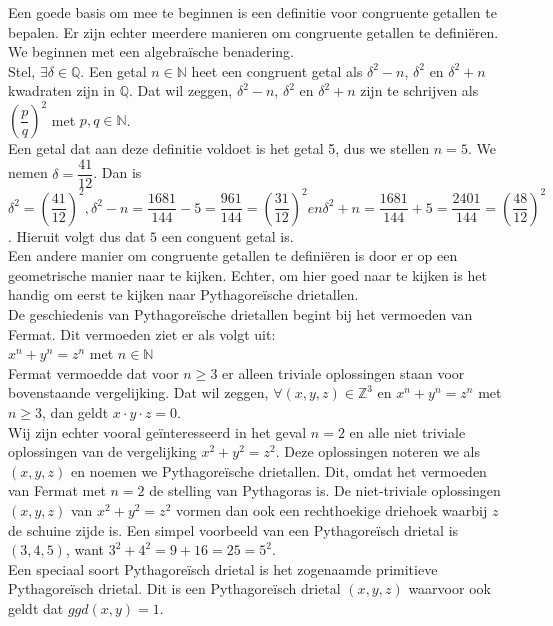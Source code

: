 \documentclass[12pt,reqno]{article}
\newcommand*{\NN}{\ensuremath{\mathbb{N}}}
\newcommand*{\ZZ}{\ensuremath{\mathbb{Z}}}
\newcommand*{\QQ}{\ensuremath{\mathbb{Q}}}
\begin{document}
	Een goede basis om mee te beginnen is een definitie voor congruente getallen te bepalen. Er zijn echter meerdere manieren om congruente getallen te defini\"{e}ren. We beginnen met een algebra\"{i}sche benadering. \\
	Stel, $\exists \delta \in \QQ$. Een getal $n \in \NN$ heet een congruent getal als $\delta^2 - n$, $\delta^2$ en $\delta^2 + n$ kwadraten zijn in \QQ. Dat wil zeggen, $\delta^2 - n$, $\delta^2$ en $\delta^2 + n$ zijn te schrijven als $\left(\dfrac{p}{q}\right)^2$ met $p, q \in \NN$. \\
	Een getal dat aan deze definitie voldoet is het getal 5, dus we stellen $n = 5$. We nemen $\delta = \dfrac{41}{12}$. Dan is $\delta^2 = \left( \dfrac{41}{12} \right)^2, \delta^2 - n = \dfrac{1681}{144} - 5 = \dfrac{961}{144} = \left( \dfrac{31}{12}\right)^2	en  \delta^2 + n = \dfrac{1681}{144} + 5 = \dfrac{2401}{144} = \left( \dfrac{48}{12}\right)^2$. Hieruit volgt dus dat $5$ een conguent getal is. \\
	Een andere manier om congruente getallen te defini\"{e}ren is door er op een geometrische manier naar te kijken. Echter, om hier goed naar te kijken is het handig om eerst te kijken naar Pythagore\"{i}sche drietallen. \\
	De geschiedenis van Pythagore\"{i}sche drietallen begint bij het vermoeden van Fermat. Dit vermoeden ziet er als volgt uit: \\
	$ x^n + y^n = z^n$ met $n \in \NN$\\
	Fermat vermoedde dat voor $n \geq 3$ er alleen triviale oplossingen staan voor bovenstaande vergelijking. Dat wil zeggen, $ \forall (x, y, z) \in \ZZ^3 $ en $ x^n + y^n = z^n $ met $ n \geq 3 $, dan geldt $ x \cdot y \cdot z = 0 $. \\
	Wij zijn echter vooral ge\"{i}nteresseerd in het geval $ n = 2 $ en alle niet triviale oplossingen van de vergelijking $ x^2 + y^2 = z^2 $. Deze oplossingen noteren we als $ (x, y, z) $ en noemen we Pythagore\"{i}sche drietallen. Dit, omdat het vermoeden van Fermat met $ n = 2 $ de stelling van Pythagoras is. De niet-triviale oplossingen $ (x, y, z) $ van $ x^2 + y^2 = z^2 $ vormen dan ook een rechthoekige driehoek waarbij $ z $ de schuine zijde is. Een simpel voorbeeld van een Pythagore\"{i}sch drietal is $ (3, 4, 5) $, want $ 3^2 + 4^2 = 9 + 16 = 25 = 5^2 $. \\
	Een speciaal soort Pythagore\"{i}sch drietal is het zogenaamde primitieve Pythagore\"{i}sch drietal. Dit is een Pythagore\"{i}sch drietal $ (x, y, z) $ waarvoor ook geldt dat $ ggd(x, y) = 1 $.
	
\end{document}

